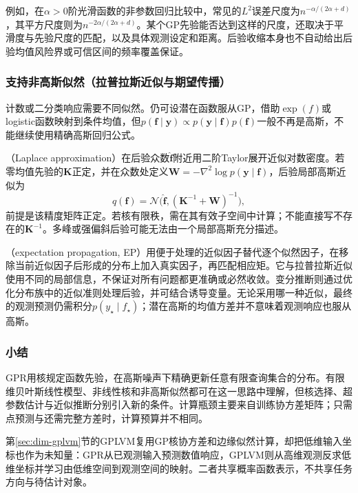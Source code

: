 例如，在$\alpha>0$阶光滑函数的非参数回归比较中，常见的$L^2$误差尺度为$n^{-\alpha/(2\alpha+d)}$，其平方尺度则为$n^{-2\alpha/(2\alpha+d)}$。某个GP先验能否达到这样的尺度，还取决于平滑度与先验尺度的匹配，以及具体观测设定和距离。后验收缩本身也不自动给出后验均值风险界或可信区间的频率覆盖保证。

\subsubsection{支持非高斯似然（拉普拉斯近似与期望传播）}
\label{sec:regression-gp-nongaussian}

计数或二分类响应需要不同似然。仍可设潜在函数服从GP，借助$\exp(f)$或logistic函数映射到条件均值，但$p(\bm{f}\mid\bm{y})\propto p(\bm{y}\mid\bm{f})p(\bm{f})$一般不再是高斯，不能继续使用精确高斯回归公式。

（Laplace approximation）在后验众数$\widehat{\bm{f}}$附近用二阶Taylor展开近似对数密度。若零均值先验的$\bm{K}$正定，并在众数处定义$\bm{W}=-\nabla^2\log p(\bm{y}\mid\bm{f})$，后验局部高斯近似为
\[
  q(\bm{f})=\mathcal{N}\bigl(
       \widehat{\bm{f}},(\bm{K}^{-1}+\bm{W})^{-1}\bigr),
\]
前提是该精度矩阵正定。若核有限秩，需在其有效子空间中计算；不能直接写不存在的$\bm{K}^{-1}$。多峰或强偏斜后验可能无法由一个局部高斯充分描述。

（expectation propagation, EP）用便于处理的近似因子替代逐个似然因子，在移除当前近似因子后形成的分布上加入真实因子，再匹配相应矩。它与拉普拉斯近似使用不同的局部信息，不保证对所有问题都更准确或必然收敛。变分推断则通过优化分布族中的近似准则处理后验，并可结合诱导变量。无论采用哪一种近似，最终的观测预测仍需积分$p(y_{\star}\mid f_{\star})$；潜在高斯的均值方差并不意味着观测响应也服从高斯。

\subsubsection{小结}

GPR用核规定函数先验，在高斯噪声下精确更新任意有限查询集合的分布。有限维贝叶斯线性模型、非线性核和非高斯似然都可在这一思路中理解，但核选择、超参数估计与近似推断分别引入新的条件。计算瓶颈主要来自训练协方差矩阵；只需点预测与还需完整方差时，计算预算并不相同。

第\ref{sec:dim-gplvm}节的GPLVM复用GP核协方差和边缘似然计算，却把低维输入坐标也作为未知量：GPR从已观测输入预测数值响应，GPLVM则从高维观测反求低维坐标并学习由低维空间到观测空间的映射。二者共享概率函数表示，不共享任务方向与待估计对象。

